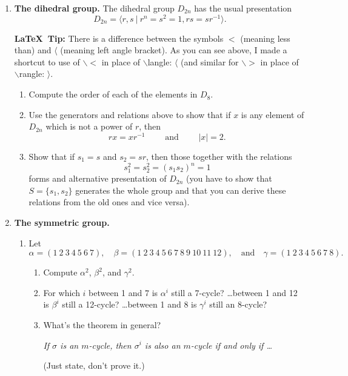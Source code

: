 \documentclass[11pt, reqno]{amsart}
\theoremstyle{plain}
\theoremstyle{definition}
\theoremstyle{example}
\newenvironment{ans}{\color{black}\medskip \paragraph*{\emph{Answer}.}}{\hfill \break  $~\!\!$ \dotfill \medskip }
\newcommand{\NOTE}[1]{{\color{blue}#1}}
\def\<{\langle} \def\>{\rangle}
\begin{document}
\begin{enumerate}[1.]
\item {\bf The dihedral group. } The dihedral group $D_{2n}$ has the usual presentation 
$$D_{2n} = \< r,s ~|~ r^n = s^2 = 1, rs=sr^{-1}\>.$$ 

\NOTE{\textbf{\LaTeX\ Tip:} There is a difference between the symbols $<$ (meaning less than) and $\langle$ (meaning left angle bracket). As you can see above, I made a shortcut to use of $\backslash\!\!<$ in place of $\backslash$langle: $\<$ (and similar for $\backslash\!\!>$  in place of $\backslash$rangle: $\>$.}

\begin{enumerate}
\item Compute the order of each of the elements in $D_8$.

%

\item Use the generators and relations above to show that if $x$ is any element of $D_{2n}$ which is not a power of $r$, then 
	$$rx = xr^{-1} \qquad \text{ and } \qquad |x| = 2.$$
	
%
	
\item Show that if $s_1 =  s$ and $s_2 = sr$, then those together with the relations 
$$s_1^2 = s_2^2 = (s_1s_2)^n = 1$$
forms and alternative presentation of $D_{2n}$ (you have to show that $S=\{s_1, s_2\}$ generates the whole group and that you can derive these relations from the old ones and vice versa). 

%
\end{enumerate}

\item {\bf The symmetric group. }
\begin{enumerate}
\item Let $$\alpha = (1~2~3~4~5~6~7), \quad \beta =(1~2~3~4~5~6~7~8~9~10~11~12), \quad \text{and}\quad \gamma = (1~2~3~4~5~6~7~8).$$
	\begin{enumerate}
	\item Compute $\alpha^2$, $\beta^2$, and $\gamma^2$.
	\item For which $i$ between 1 and 7 is $\alpha^i$ still a 7-cycle? \dots between 1 and 12 is $\beta^i$ still a 12-cycle? \dots between 1 and 8 is $\gamma^i$ still an 8-cycle?
	\item What's the theorem in general? \\
	\centerline{\emph{If $\sigma$ is an $m$-cycle, then $\sigma^i$ is also an $m$-cycle if and only if \dots}}
	(Just state, don't prove it.)
	\end{enumerate}


\end{enumerate}
\end{enumerate}
\end{document}
